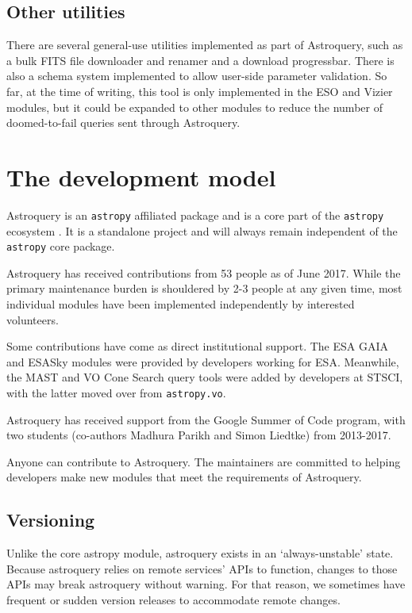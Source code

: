 \documentclass[twocolumn]{aastex61}
\begin{document}
\subsection{Other utilities}
There are several general-use utilities implemented as part of Astroquery, such
as a bulk FITS file downloader and renamer and a download progressbar.  There
is also a schema system implemented to allow user-side parameter validation.
So far, at the time of writing, this tool is only implemented in the ESO and
Vizier modules, but it could be expanded to other modules to reduce the number
of doomed-to-fail queries sent through Astroquery.

\section{The development model}
\label{sec:development}
Astroquery is an \texttt{astropy} affiliated package and is a core part of the
\texttt{astropy} ecosystem \citep{Astropy-Collaboration2013a}.  It is a
standalone project and will always remain independent of the \texttt{astropy}
core package.

Astroquery has received contributions from 53 people as of June 2017.
While the primary maintenance burden is shouldered by 2-3 people at any given time,
most individual modules have been implemented independently by interested volunteers.

Some contributions have come as direct institutional support.  The ESA GAIA and
ESASky modules were provided by developers working for ESA.  Meanwhile,
the MAST and VO Cone Search query tools were added by developers at STSCI,
with the latter moved over from \texttt{astropy.vo}.

Astroquery has received support from the Google Summer of Code
program, with two students (co-authors Madhura Parikh and Simon Liedtke)
from 2013-2017.

Anyone can contribute to Astroquery.  The maintainers are committed to helping
developers make new modules that meet the requirements of Astroquery.

\subsection{Versioning}
Unlike the core astropy module, astroquery exists in an `always-unstable' state.
Because astroquery relies on remote services' APIs to function, changes to those
APIs may break astroquery without warning.  For that reason, we sometimes have
frequent or sudden version releases to accommodate remote changes.
\end{document}
